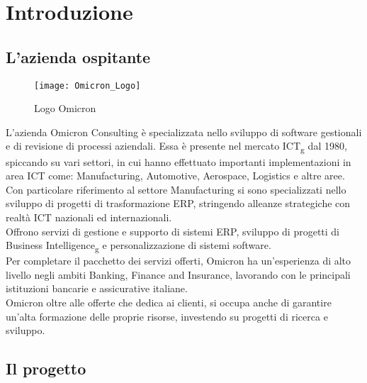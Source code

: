 \chapter{Introduzione}
\label{cap:introduzione}

\section{L'azienda ospitante}

\begin{figure}[!h] 
    \centering 
    \texttt{[image: Omicron\_Logo]} 
    \caption{Logo Omicron}
\end{figure}

\noindent L’azienda Omicron Consulting è specializzata nello sviluppo di software gestionali e di revisione di processi aziendali. Essa è presente nel mercato ICT\textsubscript{g} dal 1980, spiccando su vari settori, in cui hanno effettuato importanti implementazioni in area ICT come:  Manufacturing, Automotive, Aerospace, Logistics e altre aree.
Con particolare riferimento al settore Manufacturing si sono specializzati nello sviluppo di progetti di trasformazione ERP, stringendo alleanze strategiche con realtà ICT nazionali ed internazionali.\\
Offrono servizi di gestione e supporto di sistemi ERP, sviluppo di progetti di Business Intelligence\textsubscript{g} e personalizzazione di sistemi software.\\
Per completare il pacchetto dei servizi offerti, Omicron ha un'esperienza di alto livello negli ambiti Banking, Finance and Insurance, lavorando con le principali istituzioni bancarie e assicurative italiane.\\
Omicron oltre alle offerte che dedica ai clienti, si occupa anche di garantire un'alta formazione delle proprie risorse, investendo su progetti di ricerca e sviluppo.

\section{Il progetto}
